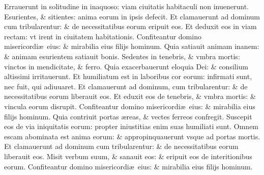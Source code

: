 \documentclass[a5paper,10pt]{book}
\def\ae{æ}
\begin{document}
\begin{multicols*}{2}
\newline \color{red} E\color{black}rrauerunt in solitudine in inaquoso: viam ciuitatis habitaculi non inuenerunt.
\newline \color{red} E\color{black}surientes, \& sitientes: anima eorum in ipsis defecit.
\newline \color{red} E\color{black}t clamauerunt ad dominum cum tribularentur: \& de necessitatibus eorum eripuit eos.
\newline \color{red} E\color{black}t deduxit eos in viam rectam: vt irent in ciuitatem habitationis.
\newline \color{red} C\color{black}onfiteantur domino misericordi\ae \ eius: \& mirabilia eius filijs hominum.
\newline \color{red} Q\color{black}uia satiauit animam inanem: \& animam esurientem satiauit bonis.
\newline \color{red} S\color{black}edentes in tenebris, \& vmbra mortis: vinctos in mendicitate, \& ferro.
\newline \color{red} Q\color{black}uia exacerbauerunt eloquia Dei: \& consilium altissimi irritauerunt.
\newline \color{red} E\color{black}t humiliatum est in laboribus cor eorum: infirmati sunt, nec fuit, qui adiuuaret.
\newline \color{red} E\color{black}t clamauerunt ad dominum, cum tribularentur: \& de necessitatibus eorum liberauit eos.
\newline \color{red} E\color{black}t eduxit eos de tenebris, \& vmbra mortis: \& vincula eorum disrupit.
\newline \color{red} C\color{black}onfiteantur domino misericordi\ae \ eius: \& mirabilia eius filijs hominum.
\newline \color{red} Q\color{black}uia contriuit portas \ae reas, \& vectes ferreos confregit.
\newline \color{red} S\color{black}uscepit eos de via iniquitatis eorum: propter iniustitias enim suas humiliati sunt.
\newline \color{red} O\color{black}mnem escam abominata est anima eorum: \& appropinquauerunt vsque ad portas mortis.
\newline \color{red} E\color{black}t clamauerunt ad dominum cum tribularentur: \& de necessitatibus eorum liberauit eos.
\newline \color{red} M\color{black}isit verbum suum, \& sanauit eos: \& eripuit eos de interitionibus eorum.
\newline \color{red} C\color{black}onfiteantur domino misericordi\ae \ eius: \& mirabilia eius filijs hominum.

\end{multicols*}
\end{document}
